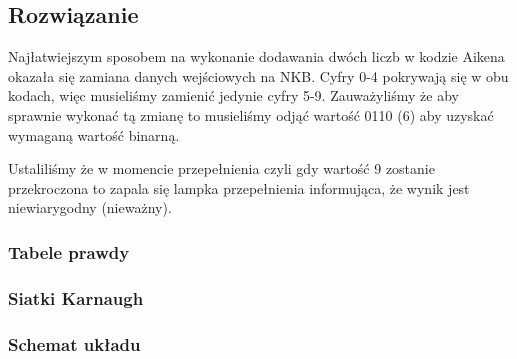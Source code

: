 \documentclass[a4paper,12pt]{extarticle}  %
\begin{document}
\subsection{Rozwiązanie}
Najłatwiejszym sposobem na wykonanie dodawania dwóch liczb w kodzie Aikena okazała się zamiana danych wejściowych na NKB.
Cyfry 0-4 pokrywają się w obu kodach, więc musieliśmy zamienić jedynie cyfry 5-9.
Zauważyliśmy że aby sprawnie wykonać tą zmianę to musieliśmy odjąć wartość 0110 (6) aby uzyskać wymaganą wartość binarną.

Ustaliliśmy że w momencie przepełnienia czyli gdy wartość 9 zostanie przekroczona to zapala się lampka przepełnienia informująca, że wynik jest niewiarygodny (nieważny).


\subsubsection{Tabele prawdy} %
\subsubsection{Siatki Karnaugh}
\subsubsection{Schemat układu}
\begin{figure}[H]
	\centering
\end{figure}
\end{document}
